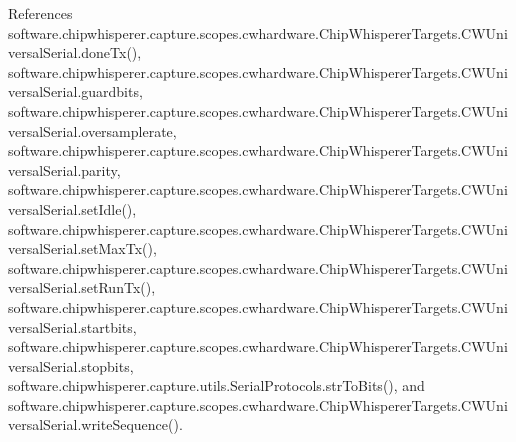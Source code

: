 References software.\+chipwhisperer.\+capture.\+scopes.\+cwhardware.\+Chip\+Whisperer\+Targets.\+C\+W\+Universal\+Serial.\+done\+Tx(), software.\+chipwhisperer.\+capture.\+scopes.\+cwhardware.\+Chip\+Whisperer\+Targets.\+C\+W\+Universal\+Serial.\+guardbits, software.\+chipwhisperer.\+capture.\+scopes.\+cwhardware.\+Chip\+Whisperer\+Targets.\+C\+W\+Universal\+Serial.\+oversamplerate, software.\+chipwhisperer.\+capture.\+scopes.\+cwhardware.\+Chip\+Whisperer\+Targets.\+C\+W\+Universal\+Serial.\+parity, software.\+chipwhisperer.\+capture.\+scopes.\+cwhardware.\+Chip\+Whisperer\+Targets.\+C\+W\+Universal\+Serial.\+set\+Idle(), software.\+chipwhisperer.\+capture.\+scopes.\+cwhardware.\+Chip\+Whisperer\+Targets.\+C\+W\+Universal\+Serial.\+set\+Max\+Tx(), software.\+chipwhisperer.\+capture.\+scopes.\+cwhardware.\+Chip\+Whisperer\+Targets.\+C\+W\+Universal\+Serial.\+set\+Run\+Tx(), software.\+chipwhisperer.\+capture.\+scopes.\+cwhardware.\+Chip\+Whisperer\+Targets.\+C\+W\+Universal\+Serial.\+startbits, software.\+chipwhisperer.\+capture.\+scopes.\+cwhardware.\+Chip\+Whisperer\+Targets.\+C\+W\+Universal\+Serial.\+stopbits, software.\+chipwhisperer.\+capture.\+utils.\+Serial\+Protocols.\+str\+To\+Bits(), and software.\+chipwhisperer.\+capture.\+scopes.\+cwhardware.\+Chip\+Whisperer\+Targets.\+C\+W\+Universal\+Serial.\+write\+Sequence().




